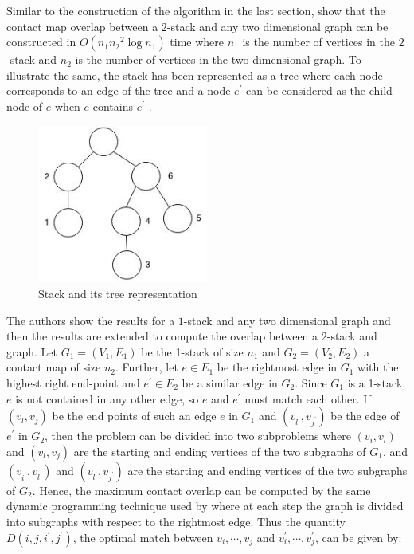 Similar to the construction of the algorithm in the last section, \citet{agmw07} show that the contact map overlap between a $2$-stack and any two dimensional graph can be constructed in $O({n_1}{n_2}^{2}\log n_1)$ time where $n_1$ is the number of vertices in the $2$-stack and $n_2$ is the number of vertices in the two dimensional graph. To illustrate the same, the stack has been represented as a tree where each node corresponds to an edge of the tree and a node $e^{\prime}$ can be considered as the child node of $e$ when $e$ contains $e^{\prime}$ \citep{agmw07}.

\begin{figure}[htbp]
\begin{minipage}[b]{0.5\linewidth}
\centering
 
 \vspace{0.65cm}
\end{minipage}
\begin{minipage}[b]{0.5\linewidth}
\centering
 \includegraphics[width=0.5\textwidth]{tree}
 \vspace{0.65cm}
\end{minipage}
\caption{Stack and its tree representation}
 \label{fig:stacktree}
\end{figure}
The authors show the results for a $1$-stack and any two dimensional graph and then the results are extended to compute the overlap between a $2$-stack and graph. Let
$G_1 = (V_1,E_1)$ be the 1-stack of size $n_1$ and $G_2 = (V_2,E_2)$ a contact map of size $n_2$. Further, let $e \in E_1$ be the rightmost edge in $G_1$ with the highest right end-point and $e^{\prime} \in E_2$ be a similar edge in $G_2$. Since $G_1$ is a 1-stack, $e$ is not contained in any other edge, so $e$ and $e^{\prime}$ must match each other. If $(v_l,v_j)$ be the end points of such an edge $e$ in $G_1$ and $(v_{l^{\prime}},v_{j^{\prime}})$ be the edge of $e^{\prime}$ in $G_2$, then the problem can be divided into two subproblems where $(v_i,v_l)$ and $(v_l,v_j)$ are the starting and ending vertices of the two subgraphs of $G_1$, and $(v_{i^{\prime}},v_{l^{\prime}})$ and $(v_{l^{\prime}},v_{j^{\prime}})$ are the starting and ending vertices of the two subgraphs of $G_2$. Hence, the maximum contact overlap can be computed by the same dynamic programming technique used by \citet{goip99} where at each step the graph is divided into subgraphs with respect to the rightmost edge. Thus the quantity $D(i,j,i^{\prime},j^{\prime})$, the optimal match between $v_i,\cdots,v_j$ and $v^{\prime}_i,\cdots,v^{\prime}_j$, can be given by:
